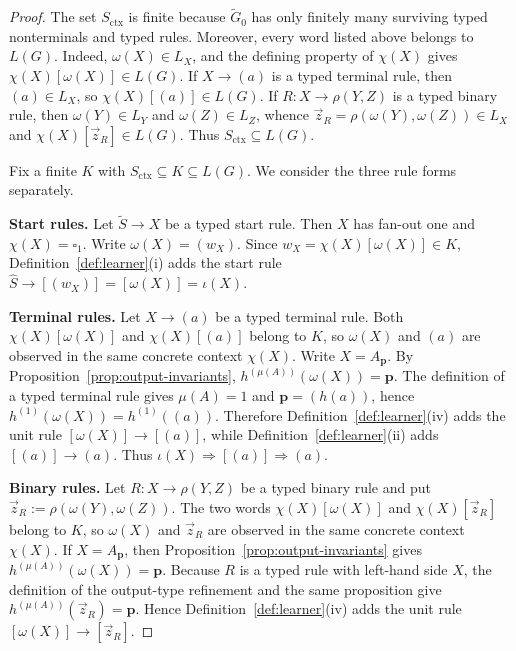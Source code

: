 \documentclass[11pt,a4paper]{article}
\theoremstyle{remark}
\newcommand{\tuple}[1]{\vec{#1}}
\newcommand{\blank}{\square}
\begin{document}
\begin{proof}
The set \(S_{\mathrm{ctx}}\) is finite because \(\widetilde G_0\) has only
finitely many surviving typed nonterminals and typed rules.  Moreover, every
word listed above belongs to \(L(G)\).  Indeed,
\(\omega(X)\in L_X\), and the defining property of \(\chi(X)\) gives
\(\chi(X)[\omega(X)]\in L(G)\).  If \(X\to(a)\) is a typed terminal rule,
then \((a)\in L_X\), so \(\chi(X)[(a)]\in L(G)\).  If
\(R\colon X\to\rho(Y,Z)\) is a typed binary rule, then
\(\omega(Y)\in L_Y\) and \(\omega(Z)\in L_Z\), whence
\(\tuple z_R=\rho(\omega(Y),\omega(Z))\in L_X\) and
\(\chi(X)[\tuple z_R]\in L(G)\).  Thus
\(S_{\mathrm{ctx}}\subseteq L(G)\).

Fix a finite \(K\) with
\(S_{\mathrm{ctx}}\subseteq K\subseteq L(G)\).  We consider the three rule
forms separately.

\medskip
\noindent
\textbf{Start rules.}
Let \(\widetilde S\to X\) be a typed start rule.  Then \(X\) has fan-out one
and \(\chi(X)=\blank_1\).  Write \(\omega(X)=(w_X)\).  Since
\(w_X=\chi(X)[\omega(X)]\in K\),
Definition~\ref{def:learner}(i) adds the start rule
\(\widehat S\to[(w_X)]=[\omega(X)]=\iota(X)\).

\medskip
\noindent
\textbf{Terminal rules.}
Let \(X\to(a)\) be a typed terminal rule.  Both
\(\chi(X)[\omega(X)]\) and \(\chi(X)[(a)]\) belong to \(K\), so
\(\omega(X)\) and \((a)\) are observed in the same concrete context
\(\chi(X)\).  Write \(X=A_{\mathbf p}\).  By
Proposition~\ref{prop:output-invariants},
\(h^{(\mu(A))}(\omega(X))=\mathbf p\).  The definition of a typed terminal
rule gives \(\mu(A)=1\) and \(\mathbf p=(h(a))\), hence
\(h^{(1)}(\omega(X))=h^{(1)}((a))\).  Therefore
Definition~\ref{def:learner}(iv) adds the unit rule
\([\omega(X)]\to[(a)]\), while Definition~\ref{def:learner}(ii) adds
\([(a)]\to(a)\).  Thus
\(\iota(X)\Rightarrow[(a)]\Rightarrow(a)\).

\medskip
\noindent
\textbf{Binary rules.}
Let \(R\colon X\to\rho(Y,Z)\) be a typed binary rule and put
\(\tuple z_R:=\rho(\omega(Y),\omega(Z))\).  The two words
\(\chi(X)[\omega(X)]\) and \(\chi(X)[\tuple z_R]\) belong to \(K\), so
\(\omega(X)\) and \(\tuple z_R\) are observed in the same concrete context
\(\chi(X)\).  If \(X=A_{\mathbf p}\), then
Proposition~\ref{prop:output-invariants} gives
\(h^{(\mu(A))}(\omega(X))=\mathbf p\).  Because \(R\) is a typed rule with
left-hand side \(X\), the definition of the output-type refinement and the
same proposition give \(h^{(\mu(A))}(\tuple z_R)=\mathbf p\).  Hence
Definition~\ref{def:learner}(iv) adds the unit rule
\([\omega(X)]\to[\tuple z_R]\).


\end{proof}
\end{document}

